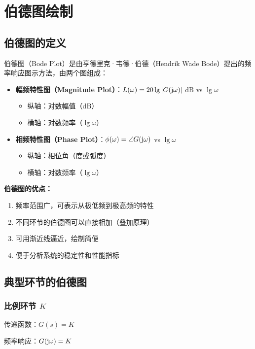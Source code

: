 \section{伯德图绘制}

\subsection{伯德图的定义}
伯德图（Bode Plot）是由亨德里克·韦德·伯德（Hendrik Wade Bode）提出的频率响应图示方法，由两个图组成：

\begin{itemize}
    \item \textbf{幅频特性图（Magnitude Plot）}：$L(\omega) = 20\lg|G(\mathrm{j}\omega)|$ dB vs $\lg\omega$
    \begin{itemize}
        \item 纵轴：对数幅值（dB）
        \item 横轴：对数频率（$\lg\omega$）
    \end{itemize}
    \item \textbf{相频特性图（Phase Plot）}：$\phi(\omega) = \angle G(\mathrm{j}\omega)$ vs $\lg\omega$
    \begin{itemize}
        \item 纵轴：相位角（度或弧度）
        \item 横轴：对数频率（$\lg\omega$）
    \end{itemize}
\end{itemize}

\textbf{伯德图的优点：}
\begin{enumerate}
    \item 频率范围广，可表示从极低频到极高频的特性
    \item 不同环节的伯德图可以直接相加（叠加原理）
    \item 可用渐近线逼近，绘制简便
    \item 便于分析系统的稳定性和性能指标
\end{enumerate}

\subsection{典型环节的伯德图}

\subsubsection{比例环节 \texorpdfstring{$K$}{K}}
传递函数：$G(s) = K$

频率响应：$G(\mathrm{j}\omega) = K$

